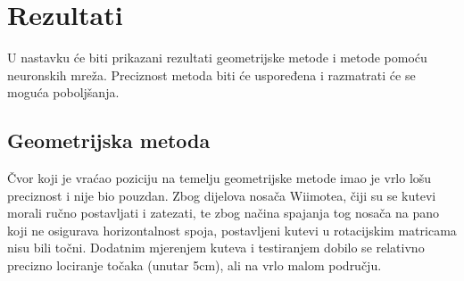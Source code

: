 \documentclass[times, utf8, diplomski]{fer}
\begin{document}
\chapter{Rezultati}
U nastavku će biti prikazani rezultati geometrijske metode i metode pomoću neuronskih mreža. Preciznost metoda biti će uspoređena i razmatrati će se moguća poboljšanja.

\section{Geometrijska metoda}
Čvor koji je vraćao poziciju na temelju geometrijske metode imao je vrlo lošu preciznost i nije bio pouzdan. Zbog dijelova nosača Wiimotea, čiji su se kutevi morali ručno postavljati i zatezati, te zbog načina spajanja tog nosača na pano koji ne osigurava horizontalnost spoja, postavljeni kutevi u rotacijskim matricama nisu bili točni. Dodatnim mjerenjem kuteva i testiranjem dobilo se relativno precizno lociranje točaka (unutar 5cm), ali na vrlo malom području.
\end{document}
